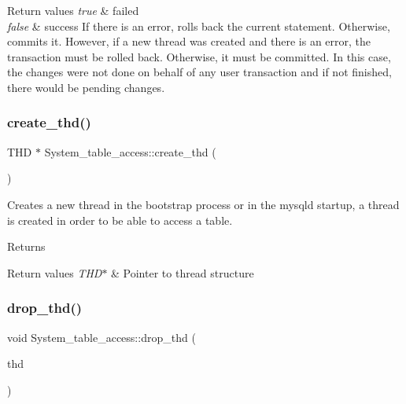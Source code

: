 \begin{DoxyRetVals}{Return values}
{\em true} & failed \\
\hline
{\em false} & success If there is an error, rolls back the current statement. Otherwise, commits it. However, if a new thread was created and there is an error, the transaction must be rolled back. Otherwise, it must be committed. In this case, the changes were not done on behalf of any user transaction and if not finished, there would be pending changes. \\
\hline
\end{DoxyRetVals}
\mbox{\label{classSystem__table__access_acefc48e24e7e4f522bafae15493d3a30}} 
\subsubsection{\texorpdfstring{create\+\_\+thd()}{create\_thd()}}
{\footnotesize\ttfamily T\+HD $\ast$ System\+\_\+table\+\_\+access\+::create\+\_\+thd (\begin{DoxyParamCaption}{ }\end{DoxyParamCaption})}

Creates a new thread in the bootstrap process or in the mysqld startup, a thread is created in order to be able to access a table.

\begin{DoxyReturn}{Returns}

\end{DoxyReturn}

\begin{DoxyRetVals}{Return values}
{\em T\+H\+D$\ast$} & Pointer to thread structure \\
\hline
\end{DoxyRetVals}
\mbox{\label{classSystem__table__access_a392fdc79727da6841d45a6c1f415ae53}} 
\subsubsection{\texorpdfstring{drop\+\_\+thd()}{drop\_thd()}}
{\footnotesize\ttfamily void System\+\_\+table\+\_\+access\+::drop\+\_\+thd (\begin{DoxyParamCaption}\item[{T\+HD $\ast$}]{thd }\end{DoxyParamCaption})}


